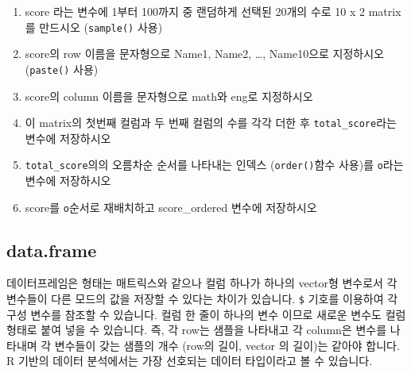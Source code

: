 \documentclass[
]{book}
\newenvironment{Shaded}{\begin{snugshade}}{\end{snugshade}}
\newcommand{\AttributeTok}[1]{\textcolor[rgb]{0.77,0.63,0.00}{#1}}
\newcommand{\DecValTok}[1]{\textcolor[rgb]{0.00,0.00,0.81}{#1}}
\newcommand{\DocumentationTok}[1]{\textcolor[rgb]{0.56,0.35,0.01}{\textbf{\textit{#1}}}}
\newcommand{\FunctionTok}[1]{\textcolor[rgb]{0.00,0.00,0.00}{#1}}
\newcommand{\NormalTok}[1]{#1}
\newcommand{\OtherTok}[1]{\textcolor[rgb]{0.56,0.35,0.01}{#1}}
\newcommand{\SpecialCharTok}[1]{\textcolor[rgb]{0.00,0.00,0.00}{#1}}
\newcommand{\StringTok}[1]{\textcolor[rgb]{0.31,0.60,0.02}{#1}}
\providecommand{\tightlist}{%
  \setlength{\itemsep}{0pt}\setlength{\parskip}{0pt}}
\begin{document}
\begin{enumerate}
\def\labelenumi{\arabic{enumi}.}
\tightlist
\item
  score 라는 변수에 1부터 100까지 중 랜덤하게 선택된 20개의 수로 10 x 2 matrix를 만드시오 (\texttt{sample()} 사용)
\item
  score의 row 이름을 문자형으로 Name1, Name2, \ldots, Name10으로 지정하시오 (\texttt{paste()} 사용)
\item
  score의 column 이름을 문자형으로 math와 eng로 지정하시오
\item
  이 matrix의 첫번째 컬럼과 두 번째 컬럼의 수를 각각 더한 후 \texttt{total\_score}라는 변수에 저장하시오
\item
  \texttt{total\_score}의의 오름차순 순서를 나타내는 인덱스 (\texttt{order()}함수 사용)를 \texttt{o}라는 변수에 저장하시오
\item
  score를 \texttt{o}순서로 재배치하고 score\_ordered 변수에 저장하시오
\end{enumerate}

\hypertarget{data.frame}{%
\subsection{data.frame}\label{data.frame}}

데이터프레임은 형태는 매트릭스와 같으나 컬럼 하나가 하나의 vector형 변수로서 각 변수들이 다른 모드의 값을 저장할 수 있다는 차이가 있습니다. \texttt{\$} 기호를 이용하여 각 구성 변수를 참조할 수 있습니다. 컬럼 한 줄이 하나의 변수 이므로 새로운 변수도 컬럼 형태로 붙여 넣을 수 있습니다. 즉, 각 row는 샘플을 나타내고 각 column은 변수를 나타내며 각 변수들이 갖는 샘플의 개수 (row의 길이, vector 의 길이)는 같아야 합니다. R 기반의 데이터 분석에서는 가장 선호되는 데이터 타입이라고 볼 수 있습니다.

\begin{Shaded}
\end{Shaded}
\end{document}

